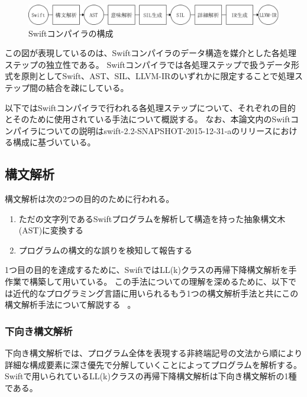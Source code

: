 \begin{figure}
    \begin{center}
        \includegraphics[scale=0.5]{./img/swift_compiler_process.png}
        \caption{Swiftコンパイラの構成}
        \label{img:swift-compiler-process}
    \end{center}
\end{figure}

この図が表現しているのは、Swiftコンパイラのデータ構造を媒介とした各処理ステップの独立性である。
Swiftコンパイラでは各処理ステップで扱うデータ形式を原則としてSwift、AST、SIL、LLVM-IRのいずれかに限定することで処理ステップ間の結合を疎にしている。

以下ではSwiftコンパイラで行われる各処理ステップについて、それぞれの目的とそのために使用されている手法について概説する。
なお、本論文内のSwiftコンパイラについての説明はswift-2.2-SNAPSHOT-2015-12-31-aのリリースにおける構成に基づいている。

\subsection{構文解析}
\label{refinement:structure:parser}

構文解析は次の2つの目的のために行われる。

\begin{enumerate}
    \item ただの文字列であるSwiftプログラムを解析して構造を持った抽象構文木(AST)に変換する
    \item プログラムの構文的な誤りを検知して報告する
\end{enumerate}

1つ目の目的を達成するために、SwiftではLL(k)クラスの再帰下降構文解析を手作業で構築して用いている。
この手法についての理解を深めるために、以下では近代的なプログラミング言語に用いられるもう1つの構文解析手法と共にこの構文解析手法について解説する ~\cite{dragonbook}。

\subsubsection{下向き構文解析}

下向き構文解析では、プログラム全体を表現する非終端記号の文法から順により詳細な構成要素に深さ優先で分解していくことによってプログラムを解析する。
Swiftで用いられているLL(k)クラスの再帰下降構文解析は下向き構文解析の1種である。

